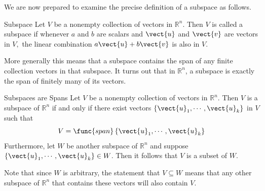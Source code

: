 We are now prepared to examine the precise definition of a subspace as follows.

\begin{definition}{Subspace}\label{def:subspace}
Let $V$ be a nonempty collection of vectors in $\mathbb{R}^{n}.$ Then
$V$ is called a subspace  if whenever $a$ and $b$  are scalars and $\vect{u}$ and $\vect{v}$
are vectors in $V,$ the linear combination $a \vect{u}+ b \vect{v}$ is also in $V$.
\end{definition}

More generally this means that a subspace contains the span of any
finite collection vectors in that subspace. It turns out that in
$\mathbb{R}^{n}$, a subspace is exactly the span of finitely many of
its vectors.

\begin{theorem}{Subspaces are Spans}\label{thm:subspacesarespans}
Let $V$ be a nonempty collection of vectors in $\mathbb{R}^{n}.$ Then $V$ is a subspace of $\mathbb{R}^{n}$ if and only if there
exist vectors $\left\{ \vect{u}_{1},\cdots ,\vect{u}_{k}\right\}$ in $V$ such that 
\[
V= \func{span}\left\{ \vect{u}_{1},\cdots ,\vect{u}_{k}\right\} 
\]
Furthermore, let $W$ be another subspace of $\mathbb{R}^n$ and suppose $\left\{ \vect{u}_{1},\cdots ,\vect{u}_{k}\right\} \in W$. Then it follows that $V$ is a subset of $W$. 
\end{theorem}

Note that since $W$ is arbitrary, the statement that $V \subseteq W$ means that any other subspace of $\mathbb{R}^n$ that contains these vectors will also contain $V$. 

